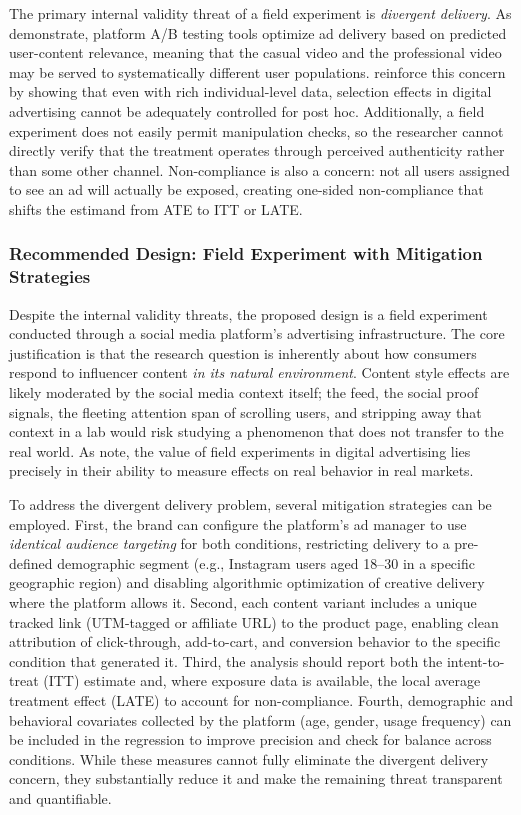 \documentclass[10pt]{article}
\begin{document}
The primary internal validity threat of a field experiment is \textit{divergent delivery}. As \cite{braun2020} demonstrate, platform A/B testing tools optimize ad delivery based on predicted user-content relevance, meaning that the casual video and the professional video may be served to systematically different user populations. \cite{gordon2019} reinforce this concern by showing that even with rich individual-level data, selection effects in digital advertising cannot be adequately controlled for post hoc. Additionally, a field experiment does not easily permit manipulation checks, so the researcher cannot directly verify that the treatment operates through perceived authenticity rather than some other channel. Non-compliance is also a concern: not all users assigned to see an ad will actually be exposed, creating one-sided non-compliance that shifts the estimand from ATE to ITT or LATE.

\subsubsection{Recommended Design: Field Experiment with Mitigation Strategies}

Despite the internal validity threats, the proposed design is a field experiment conducted through a social media platform's advertising infrastructure. The core justification is that the research question is inherently about how consumers respond to influencer content \textit{in its natural environment}. Content style effects are likely moderated by the social media context itself; the feed, the social proof signals, the fleeting attention span of scrolling users, and stripping away that context in a lab would risk studying a phenomenon that does not transfer to the real world. As \cite{gordon2019} note, the value of field experiments in digital advertising lies precisely in their ability to measure effects on real behavior in real markets.

To address the divergent delivery problem, several mitigation strategies can be employed. First, the brand can configure the platform's ad manager to use \textit{identical audience targeting} for both conditions, restricting delivery to a pre-defined demographic segment (e.g., Instagram users aged 18--30 in a specific geographic region) and disabling algorithmic optimization of creative delivery where the platform allows it. Second, each content variant includes a unique tracked link (UTM-tagged or affiliate URL) to the product page, enabling clean attribution of click-through, add-to-cart, and conversion behavior to the specific condition that generated it. Third, the analysis should report both the intent-to-treat (ITT) estimate and, where exposure data is available, the local average treatment effect (LATE) to account for non-compliance. Fourth, demographic and behavioral covariates collected by the platform (age, gender, usage frequency) can be included in the regression to improve precision and check for balance across conditions. While these measures cannot fully eliminate the divergent delivery concern, they substantially reduce it and make the remaining threat transparent and quantifiable.
\end{document}
